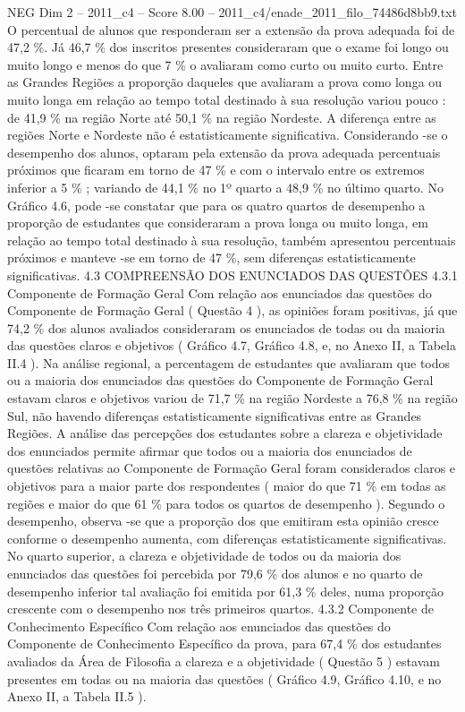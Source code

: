 \begin{textsample}{NEG Dim 2 – 2011\_c4 – Score 8.00 – 2011\_c4/enade\_2011\_filo\_74486d8bb9.txt}
O percentual de alunos que responderam ser a extensão da prova adequada foi de 47,2 \%.
Já 46,7 \% dos inscritos presentes consideraram que o exame foi longo ou muito longo e menos do que 7 \% o avaliaram como curto ou muito curto.
Entre as Grandes Regiões a proporção daqueles que avaliaram a prova como longa ou muito longa em relação ao tempo total destinado à sua resolução variou pouco : de 41,9 \% na região Norte até 50,1 \% na região Nordeste.
A diferença entre as regiões Norte e Nordeste não é estatisticamente significativa.
Considerando -se o desempenho dos alunos, optaram pela extensão da prova adequada percentuais próximos que ficaram em torno de 47 \% e com o intervalo entre os extremos inferior a 5 \% ; variando de 44,1 \% no 1º quarto a 48,9 \% no último quarto.
No Gráfico 4.6, pode -se constatar que para os quatro quartos de desempenho a proporção de estudantes que consideraram a prova longa ou muito longa, em relação ao tempo total destinado à sua resolução, também apresentou percentuais próximos e manteve -se em torno de 47 \%, sem diferenças estatisticamente significativas. 4.3 COMPREENSÃO DOS ENUNCIADOS DAS QUESTÕES 4.3.1 Componente de Formação Geral Com relação aos enunciados das questões do Componente de Formação Geral ( Questão 4 ), as opiniões foram positivas, já que 74,2 \% dos alunos avaliados consideraram os enunciados de todas ou da maioria das questões claros e objetivos ( Gráfico 4.7, Gráfico 4.8, e, no Anexo II, a Tabela II.4 ).
Na análise regional, a percentagem de estudantes que avaliaram que todos ou a maioria dos enunciados das questões do Componente de Formação Geral estavam claros e objetivos variou de 71,7 \% na região Nordeste a 76,8 \% na região Sul, não havendo diferenças estatisticamente significativas entre as Grandes Regiões.
A análise das percepções dos estudantes sobre a clareza e objetividade dos enunciados permite afirmar que todos ou a maioria dos enunciados de questões relativas ao Componente de Formação Geral foram considerados claros e objetivos para a maior parte dos respondentes ( maior do que 71 \% em todas as regiões e maior do que 61 \% para todos os quartos de desempenho ).
Segundo o desempenho, observa -se que a proporção dos que emitiram esta opinião cresce conforme o desempenho aumenta, com diferenças estatisticamente significativas.
No quarto superior, a clareza e objetividade de todos ou da maioria dos enunciados das questões foi percebida por 79,6 \% dos alunos e no quarto de desempenho inferior tal avaliação foi emitida por 61,3 \% deles, numa proporção crescente com o desempenho nos três primeiros quartos. 4.3.2 Componente de Conhecimento Específico Com relação aos enunciados das questões do Componente de Conhecimento Específico da prova, para 67,4 \% dos estudantes avaliados da Área de Filosofia a clareza e a objetividade ( Questão 5 ) estavam presentes em todas ou na maioria das questões ( Gráfico 4.9, Gráfico 4.10, e no Anexo II, a Tabela II.5 ).

\end{textsample}
